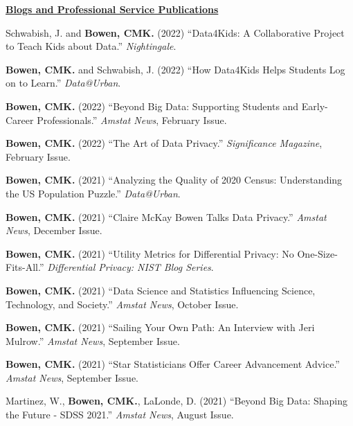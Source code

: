 \documentclass[11pt, letterpaper, roman]{moderncv} %
\begin{document}
\vspace{6pt}
\noindent\underline{\textbf{Blogs and Professional Service Publications}}
\vspace{4pt}
\begin{etaremune}[topsep=0pt, itemsep=4pt, partopsep=0pt, parsep=0pt]
    \item Schwabish, J. and \textbf{Bowen, CMK.} (2022) ``Data4Kids: A Collaborative Project to Teach Kids about Data.'' \textit{Nightingale}.
    
    \item \textbf{Bowen, CMK.} and Schwabish, J. (2022) ``How Data4Kids Helps Students Log on to Learn.'' \textit{Data@Urban}.

    \item \textbf{Bowen, CMK.} (2022) ``Beyond Big Data: Supporting Students and Early-Career Professionals.'' \textit{Amstat News}, February Issue.
    
    \item \textbf{Bowen, CMK.} (2022) ``The Art of Data Privacy.'' \textit{Significance Magazine}, February Issue.
    
    \item \textbf{Bowen, CMK.} (2021) ``Analyzing the Quality of 2020 Census: Understanding the US Population Puzzle.'' \textit{Data@Urban}.

    \item \textbf{Bowen, CMK.} (2021) ``Claire McKay Bowen Talks Data Privacy.'' \textit{Amstat News}, December Issue.
    
    \item \textbf{Bowen, CMK.} (2021) ``Utility Metrics for Differential Privacy: No One-Size-Fits-All.'' \textit{Differential Privacy: NIST Blog Series}.
    
    \item \textbf{Bowen, CMK.} (2021) ``Data Science and Statistics Influencing Science, Technology, and Society.'' \textit{Amstat News}, October Issue.
    
    \item \textbf{Bowen, CMK.} (2021) ``Sailing Your Own Path: An Interview with Jeri Mulrow.'' \textit{Amstat News}, September Issue.

    \item \textbf{Bowen, CMK.} (2021) ``Star Statisticians Offer Career Advancement Advice.'' \textit{Amstat News}, September Issue.    
    
    \item Martinez, W., \textbf{Bowen, CMK.}, LaLonde, D. (2021) ``Beyond Big Data: Shaping the Future - SDSS 2021.'' \textit{Amstat News}, August Issue.   
    

\end{etaremune}
\end{document}
